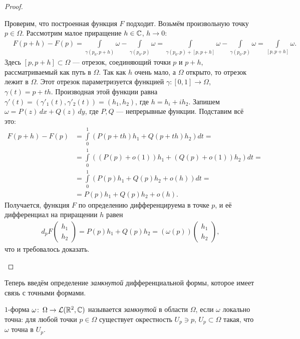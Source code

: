 \documentclass[../complex-analysis.tex]{subfiles}
\begin{document}
\begin{proof}
\begin{itemize}
   Проверим, что построенная функция $F$ подходит. Возьмём произвольную точку $p \in \Omega$. Рассмотрим малое приращение $h \in \mathbb{C}$, $h \to 0$:
   \begin{align*}
    &F(p + h) - F(p) = \int\limits_{\gamma(p_0,p + h)}  \omega - \int\limits_{\gamma(p_0,p)}  \omega = \int\limits_{\gamma(p_0,p) + [p,p+h]} \omega - \int\limits_{\gamma(p_0,p)}   \omega = \int\limits_{[p,p+h]} \omega.
   \end{align*} Здесь $[p,p+h] \subset \Omega$ --- отрезок, соединяющий точки $p$ и $p + h$, рассматриваемый как путь в $\Omega$. Так как $h$ очень мало, а $\Omega$ открыто, то отрезок лежит в $\Omega$. Этот отрезок параметризуется функцией $\gamma \colon [0,1] \to \Omega$, $\gamma(t) = p + th$. Производная этой функции равна $\gamma'(t) = (\gamma'_1(t), \gamma'_2(t)) = (h_1, h_2)$, где $h = h_i + i h_2$. Запишем $\omega = P(z)\,dx + Q(z)\,dy$, где $P,Q$ --- непрерывные функции. Подставим всё это:
   \begin{align*}
    F(p+h)-F(p) &= \int\limits_{0}^{1} \left( P(p+th) h_1 + Q(p+th) h_2 \right)dt = \\
    &=  \int\limits_{0}^{1} \left( (P(p) + o(1))h_1 + (Q(p) + o(1))h_2 \right)dt = \\
    &= \int\limits_{0}^{1} \left( P(p)h_1 + Q(p)h_2 + o(h) \right)dt = \\
    &= P(p)h_1 + Q(p)h_2 + o(h).
   \end{align*} Получается, функция $F$ по определению дифференцируема в точке $p$, и её дифференциал на приращении $h$ равен
   \begin{align*}
    d_p F \begin{pmatrix}
     h_1 \\ h_2
     \end{pmatrix} = P(p) h_1 + Q(p) h_2 = \left( \omega(p) \right) \begin{pmatrix}
     h_1 \\ h_2
    \end{pmatrix}
   ,\end{align*} что и требовалось доказать.
 \end{itemize}
\end{proof}

Теперь введём определение \textit{замкнутой} дифференциальной формы, которое имеет связь с точными формами.

\begin{df}
 $1$-форма $\omega \colon\,\Omega\to\mathcal{L}(\mathbb{R}^2, \mathbb{C})$ называется \textit{замкнутой} в области $\Omega$, если $\omega$ локально точна: для любой точки $p \in \Omega$ существует окрестность $U_p \ni p$, $U_p \subset \Omega$ такая, что $\omega$ точна в $U_p$.
\end{df}
\end{document}

